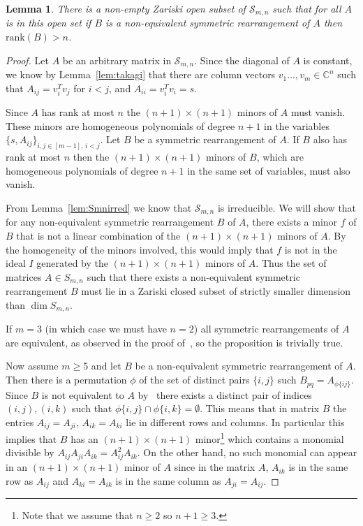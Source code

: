\documentclass{article}
\newtheorem{Lemma}{Lemma}
\theoremstyle{definition}
\renewcommand{\|}{|}
\renewcommand{\c}{\mathbb{C}}
\newcommand{\rank}[1]{\mathrm{rank}\left(#1\right)}
\begin{document}
\begin{Lemma} \label{prop.relaxation}
There is a non-empty Zariski open subset of $\mathcal{S}_{m,n}$ such that for all $A$ is in this open set
if $B$ is a 
non-equivalent symmetric rearrangement of $A$ then $\rank{B} > n$. 
\end{Lemma}
\begin{proof}
Let $A$
be an arbitrary matrix in $\mathcal{S}_{m,n}$. Since the diagonal of $A$ is constant, we
 know by Lemma~\ref{lem:takagi} that there are column vectors $v_1 \ldots , v_m \in \c^n$ such
 that $A_{ij} =v_i^T v_j$ for $i < j$,  and $A_{ii} = v_i^T v_i=s$. 
 
Since $A$ has rank at most $n$ the $(n+1) \times (n+1)$ 
minors of $A$ must vanish. These minors are homogeneous polynomials of degree $n+1$ in the variables
$\{s, A_{ij}\}_{i,j \in [m-1], \, i<j}$.
Let $B$ be a symmetric rearrangement 
of $A$. If $B$ also has rank at most $n$ then the $(n+1)\times (n+1)$ minors of $B$, which are homogeneous polynomials
of degree $n+1$
in the same set of variables, must also vanish. 

From Lemma~\ref{lem:Smnirred} we know that $\mathcal{S}_{m,n}$ is irreducible. We will show that for any non-equivalent symmetric rearrangement $B$ of $A$, there exists a minor $f$ of $B$ that is not a linear combination of the $(n+1)\times (n+1)$ minors of $A$. By the homogeneity of the minors involved, this would imply that $f$ is not in the ideal $I$ generated by the $(n+1)\times (n+1)$ minors of $A$. Thus the set of matrices $A
\in S_{m,n}$ such that there exists a non-equivalent symmetric rearrangement  $B$
must 
lie in a Zariski closed subset of strictly smaller dimension than $\dim S_{m,n}$.

If $m =3$ (in which case we must have $n=2$) all symmetric rearrangements of $A$ are equivalent, as observed
 in the proof of~\cite[Lemma 1.2]{boutin2007which}, so the proposition is trivially true.

 Now assume $m \geq 5$ and let $B$ be a non-equivalent symmetric rearrangement of $A$. 
 Then there is a permutation $\phi$ of the set of distinct pairs $\{i,j\}$ such
 $B_{pq} = A_{\phi\{ij\}}$. Since $B$ is not equivalent to $A$ by~\cite[Lemma 1.2]{boutin2007which}
 there exists a distinct pair of indices $(i,j),(i,k)$ such that $\phi\{i,j\} \cap \phi\{i,k\} = \emptyset$.
 This means that in matrix $B$ the entries $A_{ij}= A_{ji}$, $A_{ik}=A_{ki}$ lie in different rows and columns. In particular
 this implies that $B$ has an $(n+1) \times (n+1)$ minor\footnote{Note that we assume that $n \geq 2$ so $n+1 \geq 3$.} which contains a monomial divisible by
 $A_{ij} A_{ji} A_{ik} = A_{ij}^2 A_{ik}$. On the other hand, no such monomial can appear in an $(n+1) \times (n+1)$ minor of $A$
since  in the matrix $A$, $A_{ik}$ is in the same row as $A_{ij}$ and $A_{ki} = A_{ik}$ is in the same column
as $A_{ji} = A_{ij}$.


\end{proof}
\end{document}
